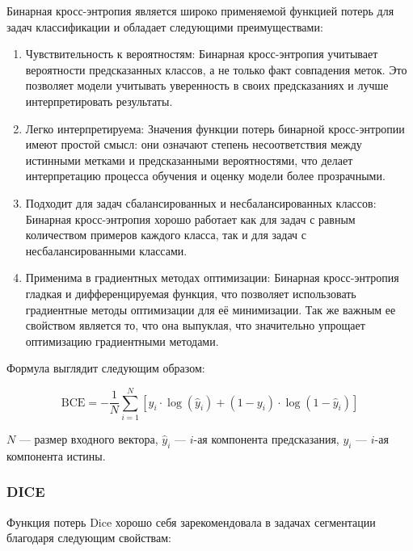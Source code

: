 Бинарная кросс-энтропия является широко применяемой функцией потерь для задач
классификации и обладает следующими преимуществами:

\begin{enumerate}
	\item Чувствительность к вероятностям: Бинарная кросс-энтропия учитывает
	вероятности предсказанных классов, а не только факт совпадения меток. Это
	позволяет модели учитывать уверенность в своих предсказаниях и лучше
	интерпретировать результаты.

	\item Легко интерпретируема: Значения функции потерь бинарной
	кросс-энтропии имеют простой смысл: они означают степень несоответствия
	между истинными метками и предсказанными вероятностями, что делает
	интерпретацию процесса обучения и оценку модели более прозрачными.

	\item Подходит для задач сбалансированных и несбалансированных классов:
	Бинарная кросс-энтропия хорошо работает как для задач с равным количеством
	примеров каждого класса, так и для задач с несбалансированными классами.

	\item Применима в градиентных методах оптимизации: Бинарная кросс-энтропия
	гладкая и дифференцируемая функция, что позволяет использовать градиентные
	методы оптимизации для её минимизации. Так же важным ее свойством является
	то, что она выпуклая, что значительно упрощает оптимизацию градиентными
	методами.


\end{enumerate}

Формула выглядит следующим образом:

\begin{equation}
	\text{BCE} = - \frac{1}{N} \sum_{i=1}^{N} \left[ y_i \cdot \log(\hat{y}_i) + (1 - y_i)
		\cdot \log(1 - \hat{y}_i) \right]
	\label{eq:bce}
\end{equation}

\noindent $N$ --- размер входного вектора, $\hat{y}_i$ --- $i$-ая компонента
предсказания, $y_i$ --- $i$-ая компонента истины.

\subsubsection{DICE}

Функция потерь Dice хорошо себя зарекомендовала в задачах сегментации благодаря
следующим свойствам:

